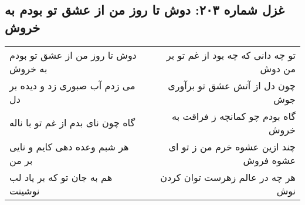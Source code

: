 \begin{center}
\section*{غزل شماره ۲۰۳: دوش تا روز من از عشق تو بودم به خروش}
\label{sec:203}
\begin{longtable}{l p{0.5cm} r}
دوش تا روز من از عشق تو بودم به خروش
&&
تو چه دانی که چه بود از غم تو بر من دوش
\\
می زدم آب صبوری زد و دیده بر دل
&&
چون دل از آتش عشق تو برآوری جوش
\\
گاه چون نای بدم از غم تو با ناله
&&
گاه بودم چو کمانچه ز فراقت به خروش
\\
هر شبم وعده دهی کایم و نایی بر من
&&
چند ازین عشوه خرم من ز تو ای عشوه فروش
\\
هم به جان تو که بر یاد لب نوشینت
&&
هر چه در عالم زهرست توان کردن نوش
\\
\end{longtable}
\end{center}
